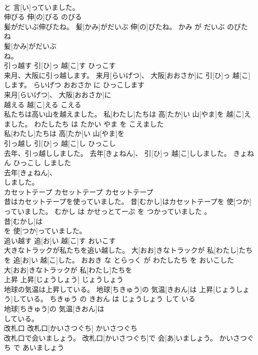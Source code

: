 \documentclass[8pt]{extreport}
\begin{document}
\begin{CJK}{UTF8}{min}
\\	と 言[い]っていました。			
\\	伸びる	伸[の]びる	のびる	
\\	髪がだいぶ伸びたね。	髪[かみ]がだいぶ 伸[の]びたね。	かみ が だいぶ のびた ね	
\\	髪[かみ]がだいぶ
\\	ね。			
\\	引っ越す	引[ひ]っ 越[こ]す	ひっこす	
\\	来月、大阪に引っ越します。	来月[らいげつ]、 大阪[おおさか]に 引[ひ]っ 越[こ]します。	らいげつ おおさか に ひっこします	
\\	来月[らいげつ]、 大阪[おおさか]に
\\	越える	越[こ]える	こえる	
\\	私たちは高い山を越えました。	私[わたし]たちは 高[たか]い 山[やま]を 越[こ]えました。	わたしたち は たかい やま を こえました	
\\	私[わたし]たちは 高[たか]い 山[やま]を
\\	引っ越し	引[ひ]っ 越[こ]し	ひっこし	
\\	去年、引っ越ししました。	去年[きょねん]、 引[ひ]っ 越[こ]ししました。	きょねん ひっこし しました	
\\	去年[きょねん]、
\\	しました。			
\\	カセットテープ	カセットテープ	カセットテープ	
\\	昔はカセットテープを使っていました。	昔[むかし]はカセットテープを 使[つか]っていました。	むかし は かせっとてーぷ を つかっていました 。	
\\	昔[むかし]は
\\	を 使[つか]っていました。			
\\	追い越す	追[お]い 越[こ]す	おいこす	
\\	大きなトラックが私たちを追い越した。	大[おお]きなトラックが 私[わたし]たちを 追[お]い 越[こ]した。	おおき な とらっく が わたしたち を おいこした	
\\	大[おお]きなトラックが 私[わたし]たちを
\\	上昇	上昇[じょうしょう]	じょうしょう	
\\	地球の気温は上昇している。	地球[ちきゅう]の 気温[きおん]は 上昇[じょうしょう]している。	ちきゅう の きおん は じょうしょう して いる	
\\	地球[ちきゅう]の 気温[きおん]は
\\	している。			
\\	改札口	改札口[かいさつぐち]	かいさつぐち	
\\	改札口で会いましょう。	改札口[かいさつぐち]で 会[あ]いましょう。	かいさつぐち で あいましょう	

\end{CJK}
\end{document}
